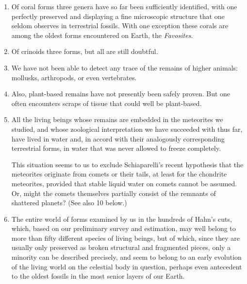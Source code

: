 \documentclass[a4paper, 12pt, oneside]{article}
\begin{document}
\begin{enumerate}
\item Of coral forms three genera have so far been sufficiently identified, with one perfectly preserved and displaying a fine microscopic structure that one seldom observes in terrestrial fossils. With one exception these corals are among the oldest forms encountered on Earth, the \emph{Favosites}.

\item Of crinoids three forms, but all are still doubtful.

\item We have not been able to detect any trace of the remains of higher animals: mollusks, arthropods, or even vertebrates.

\item Also, plant-based remains have not presently been safely proven. But one often encounters scraps of tissue that could well be plant-based.

\item All the living beings whose remains are embedded in the meteorites we studied, and whose zoological interpretation we have succeeded with thus far, have lived in water and, in accord with their analogously corresponding terrestrial forms, in water that was never allowed to freeze completely.

This situation seems to us to exclude Schiaparelli's recent hypothesis that the meteorites originate from comets or their tails, at least for the chondrite meteorites, provided that stable liquid water on comets cannot be assumed. Or, might the comets themselves partially consist of the remnants of shattered planets? (See also 10 below.)

\item The entire world of forms examined by us in the hundreds of Hahn's cuts, which, based on our preliminary survey and estimation, may well belong to more than fifty different species of living beings, but of which, since they are usually only preserved as broken structural and fragmented pieces, only a minority can be described precisely, and seem to belong to an early evolution of the living world on the celestial body in question, perhaps even antecedent to the oldest fossils in the most senior layers of our Earth.


\end{enumerate}
\end{document}
